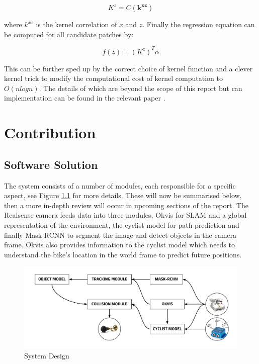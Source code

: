 \documentclass[11pt,twoside]{report}
\begin{document}
\begin{equation}
K^{z} = C(\mathbf{k^{xz}})
\end{equation}

where $k^{xz}$ is the kernel correlation of $x$ and $z$. Finally the regression equation can be computed for all candidate patches by:

\begin{equation}
f(z) = (K^{z})^{T} \alpha
\end{equation}

This can be further sped up by the correct choice of kernel function and a clever kernel trick to modify the computational cost of kernel computation to $O(nlogn)$. The details of which are beyond the scope of this report but can implementation can be found in the relevant paper \cite{kcf}.

\chapter{Contribution}


\section{Software Solution}
The system consists of a number of modules, each responsible for a specific aspect, see Figure \ref{software_soln} for more details. These will now be summarised below, then a more in-depth review will occur in upcoming sections of the report. The Realsense camera feeds data into three modules, Okvis for SLAM and a global representation of the environment, the cyclist model for path prediction and finally Mask-RCNN to segment the image and detect objects in the camera frame. Okvis also provides information to the cyclist model which needs to understand the bike's location in the world frame to predict future positions.

\noindent \begin{figure}[h!]
	\includegraphics[width = 1.0\hsize]{figures/software_architecture.png}
	\caption{System Design}
	\label{software_soln}
\end{figure}
\end{document}

